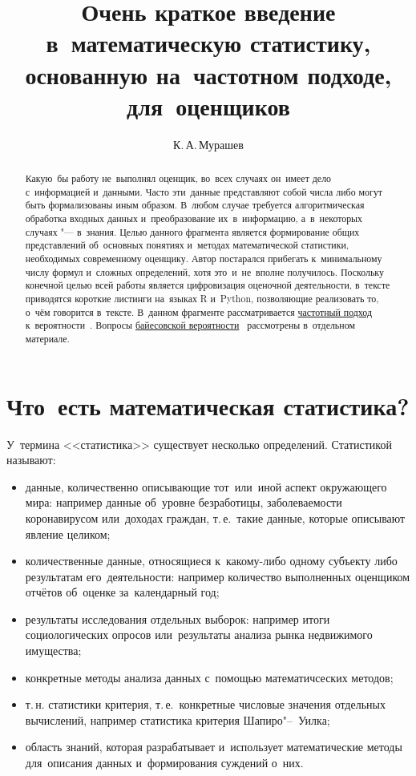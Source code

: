 \documentclass[]{scrartcl}
\title{Очень краткое введение в~математическую статистику, основанную на~частотном подходе, для~оценщиков}
\author{К.\,А.\,Мурашев}
\begin{document}
\maketitle

\begin{abstract}
	Какую~бы работу не~выполнял оценщик, во~всех случаях он~имеет дело с~информацией и~данными. Часто эти~данные представляют собой числа либо могут быть формализованы иным образом. В~любом случае требуется алгоритмическая обработка входных данных и~преобразование их~в~информацию, а~в~некоторых случаях "--- в~знания. Целью данного фрагмента является формирование общих представлений об~основных понятиях и~методах математической статистики, необходимых современному оценщику. Автор постарался прибегать к~минимальному числу формул и~сложных определений, хотя это~и~не~вполне получилось. Поскольку конечной целью всей работы является цифровизация оценочной деятельности, в~тексте приводятся короткие листинги на~языках R и~Python, позволяющие реализовать то, о~чём говорится в~тексте. В~данном фрагменте рассматривается \href{https://ru.wikipedia.org/wiki/Частотная_вероятность}{частотный подход} к~вероятности~\cite{Wiki:Freq-probability}. Вопросы  \href{https://ru.wikipedia.org/wiki/Байесовская_вероятность}{байесовской вероятности}~\cite{Wiki:Bayes-prob} рассмотрены в~отдельном материале.
\end{abstract}

\tableofcontents

\section{Что~есть математическая статистика?}
У~термина <<статистика>> существует несколько определений. Статистикой называют:
	\begin{itemize}
		\item данные, количественно описывающие тот~или~иной аспект окружающего мира: например данные об~уровне безработицы, заболеваемости коронавирусом или~доходах граждан, т.\,е.~такие данные, которые описывают явление целиком;
		\item количественные данные, относящиеся к~какому-либо одному субъекту либо результатам его~деятельности: например количество выполненных оценщиком отчётов об~оценке за~календарный год;
		\item результаты исследования отдельных выборок: например итоги социологических опросов или~результаты анализа рынка недвижимого имущества;
		\item конкретные методы анализа данных с~помощью математичсеских методов;
		\item т.\,н. статистики критерия, т.\,е.~конкретные числовые значения отдельных вычислений, например статистика критерия Шапиро"--~Уилка;
		\item область знаний, которая разрабатывает и~использует математические методы для~описания данных и~формирования суждений о~них.		   
	\end{itemize}
\end{document}
